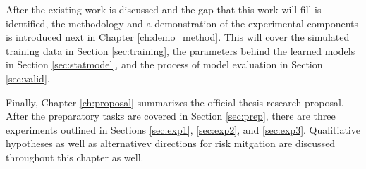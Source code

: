 After the existing work is discussed and the gap that this work will fill is
identified, the methodology and a demonstration of the experimental components
is introduced next in Chapter \ref{ch:demo_method}. This will cover the
simulated training data in Section \ref{sec:training}, the parameters behind
the learned models in Section \ref{sec:statmodel}, and the process of model
evaluation in Section \ref{sec:valid}.  

Finally, Chapter \ref{ch:proposal} summarizes the official thesis research
proposal. After the preparatory tasks are covered in Section \ref{sec:prep},
there are three experiments outlined in Sections \ref{sec:exp1},
\ref{sec:exp2}, and \ref{sec:exp3}. Qualitiative hypotheses as well as
alternativev directions for risk mitgation are discussed throughout this
chapter as well. 
